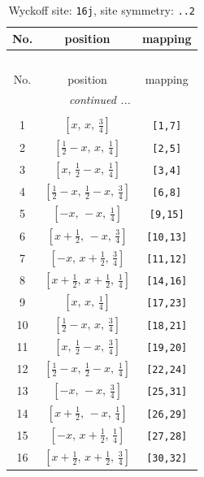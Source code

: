 \documentclass[fleqn,8pt]{jsarticle}
\begin{document}
\renewcommand{\arraystretch}{1.2}
\begin{longtable}{ccc}
\caption{Wyckoff site: {\tt 16j}, site symmetry: {\tt ..2}}
 \\
 \hline \hline
No. & position & mapping \\ \hline \endfirsthead

\multicolumn{2}{l}{\tablename\ \thetable{}} \\
 \hline \hline
No. & position & mapping \\ \hline \endhead

 \hline \hline
\multicolumn{2}{r}{\footnotesize\it continued ...} \\ \endfoot

 \hline \hline
\multicolumn{2}{r}{} \\ \endlastfoot

1 & $\left[ x,\, x,\, \frac{3}{4} \right]$ & {\tt [1,7]} \\ \hline
2 & $\left[ \frac{1}{2} - x,\, x,\, \frac{1}{4} \right]$ & {\tt [2,5]} \\ \hline
3 & $\left[ x,\, \frac{1}{2} - x,\, \frac{1}{4} \right]$ & {\tt [3,4]} \\ \hline
4 & $\left[ \frac{1}{2} - x,\, \frac{1}{2} - x,\, \frac{3}{4} \right]$ & {\tt [6,8]} \\ \hline
5 & $\left[ - x,\, - x,\, \frac{1}{4} \right]$ & {\tt [9,15]} \\ \hline
6 & $\left[ x + \frac{1}{2},\, - x,\, \frac{3}{4} \right]$ & {\tt [10,13]} \\ \hline
7 & $\left[ - x,\, x + \frac{1}{2},\, \frac{3}{4} \right]$ & {\tt [11,12]} \\ \hline
8 & $\left[ x + \frac{1}{2},\, x + \frac{1}{2},\, \frac{1}{4} \right]$ & {\tt [14,16]} \\ \hline
9 & $\left[ x,\, x,\, \frac{1}{4} \right]$ & {\tt [17,23]} \\ \hline
10 & $\left[ \frac{1}{2} - x,\, x,\, \frac{3}{4} \right]$ & {\tt [18,21]} \\ \hline
11 & $\left[ x,\, \frac{1}{2} - x,\, \frac{3}{4} \right]$ & {\tt [19,20]} \\ \hline
12 & $\left[ \frac{1}{2} - x,\, \frac{1}{2} - x,\, \frac{1}{4} \right]$ & {\tt [22,24]} \\ \hline
13 & $\left[ - x,\, - x,\, \frac{3}{4} \right]$ & {\tt [25,31]} \\ \hline
14 & $\left[ x + \frac{1}{2},\, - x,\, \frac{1}{4} \right]$ & {\tt [26,29]} \\ \hline
15 & $\left[ - x,\, x + \frac{1}{2},\, \frac{1}{4} \right]$ & {\tt [27,28]} \\ \hline
16 & $\left[ x + \frac{1}{2},\, x + \frac{1}{2},\, \frac{3}{4} \right]$ & {\tt [30,32]} \\
\end{longtable}
\end{document}

